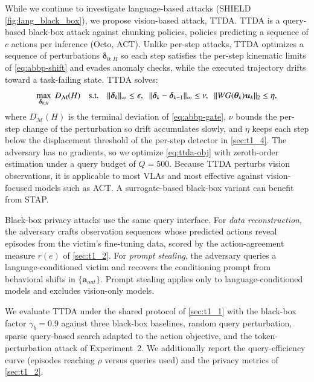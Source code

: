  While we continue to investigate language-based attacks (\eg SHIELD \autoref{fig:lang_black_box}), we propose vision-based attack, TTDA.
TTDA is a query-based black-box attack against chunking policies, \ie policies predicting a sequence of $c$ actions per inference (\eg Octo, ACT). Unlike per-step attacks, TTDA optimizes a sequence of perturbations $\bm{\delta}_{0:H}$ so each step satisfies the per-step kinematic limits of \autoref{eq:abbp-shift} and evades anomaly checks, while the executed trajectory drifts toward a task-failing state. TTDA solves:
\vspace{-1ex}\begin{equation}
\max_{\bm{\delta}_{0:H}}\; D_{\mathcal{M}}(H)
\quad\text{s.t.}\quad
\|\bm{\delta}_k\|_{\infty}\le\epsilon,\;\;
\|\bm{\delta}_k-\bm{\delta}_{k-1}\|_{\infty}\le\nu,\;\;
\|W G(\bm{\theta}_k)\bm{u}_k\|_{2}\le\eta,
\label{eq:ttda-obj}
\vspace{-1.5ex}\end{equation}
where $D_{\mathcal{M}}(H)$ is the terminal deviation of \autoref{eq:abbp-gate}, $\nu$ bounds the per-step change of the perturbation so drift accumulates slowly, and $\eta$ keeps each step below the displacement threshold of the per-step detector in \autoref{sec:t1_4}. The adversary has no gradients, so we optimize \autoref{eq:ttda-obj} with zeroth-order estimation under a query budget of $Q{=}500$. Because TTDA perturbs vision observations, it is applicable to most VLAs and most effective against vision-focused models such as ACT. 
A surrogate-based black-box variant can benefit from STAP. 

 Black-box privacy attacks use the same query interface. For \emph{data reconstruction}, the adversary crafts observation sequences whose predicted actions reveal episodes from the victim's fine-tuning data, scored by the action-agreement measure $r(e)$ of \autoref{sec:t1_2}. For \emph{prompt stealing}, the adversary queries a language-conditioned victim and recovers the conditioning prompt from behavioral shifts in $\{\bm{a}_{out}\}$. Prompt stealing applies only to language-conditioned models and excludes vision-only models.


 We evaluate TTDA under the shared protocol of \autoref{sec:t1_1} with the black-box factor $\gamma_{b}{=}0.9$ against three black-box baselines, \ie random query perturbation, sparse query-based search adapted to the action objective, and the token-perturbation attack of Experiment~2. 
We additionally report the query-efficiency curve (episodes reaching $\rho$ versus queries used) and the privacy metrics of \autoref{sec:t1_2}.



